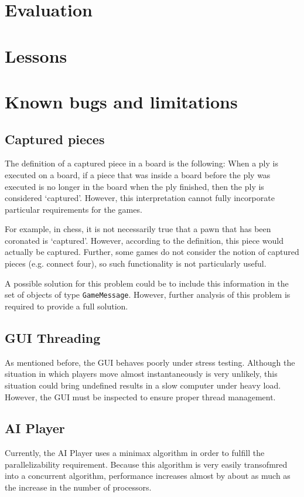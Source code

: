 \section{Evaluation}
\section{Lessons}

\section{Known bugs and limitations}
	\subsection{Captured pieces} 
	The definition of a captured piece in a board is the following: When a ply is executed on a board, if a piece that 
	was inside a board before the ply was executed is no longer in the board when the ply finished, then the ply is
	considered `captured'. However, this interpretation cannot fully incorporate particular requirements for the games.
	
	For example, in chess, it is not necessarily true that a pawn that has been coronated is `captured'. However,
	according to the definition, this piece would actually be captured. Further, some games do not consider the notion
	of captured pieces (e.g. connect four), so such functionality is not particularly useful. 
	
	A possible solution for this problem could be to include this information in the set of objects of type
	\texttt{GameMessage}. However, further analysis of this problem is required to provide a full solution.
	
	\subsection{GUI Threading}
	As mentioned before, the GUI behaves poorly under stress testing. Although the situation in which players
	move almost instantaneously is very unlikely, this situation could bring undefined results in a slow computer
	under heavy load. However, the GUI must be inspected to ensure proper thread management. 
	
	\subsection{AI Player}
	Currently, the AI Player uses a minimax algorithm in order to fulfill the parallelizability requirement. 
	Because this algorithm is very easily transofmred into a concurrent algorithm, performance increases almost
	by about as much as the increase in the number of processors. 
	
